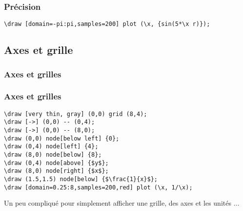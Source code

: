 \documentclass{clic_latex_beamer}
\begin{document}
\begin{frame}[fragile]
\frametitle{Précision}

\begin{lstlisting}
\draw [domain=-pi:pi,samples=200] plot (\x, {sin(5*\x r)});
\end{lstlisting}

\pause


\end{frame}

\subsection{Axes et grille}
\begin{frame}[fragile]
\frametitle{Axes et grilles}


\end{frame}

\begin{frame}[fragile]
\frametitle{Axes et grilles}

\begin{lstlisting}
\draw [very thin, gray] (0,0) grid (8,4);
\draw [->] (0,0) -- (0,4);
\draw [->] (0,0) -- (8,0);
\draw (0,0) node[below left] {0};
\draw (0,4) node[left] {4};
\draw (8,0) node[below] {8};
\draw (0,4) node[above] {$y$};
\draw (8,0) node[right] {$x$};
\draw (1.5,1.5) node[below] {$\frac{1}{x}$};
\draw [domain=0.25:8,samples=200,red] plot (\x, 1/\x);
\end{lstlisting}

Un peu compliqué pour simplement afficher une grille, des axes et les unités ...

\end{frame}
\end{document}
